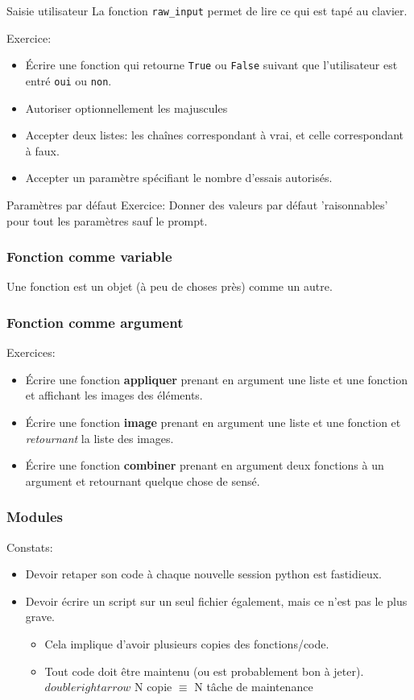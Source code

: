 \documentclass{beamer}
\begin{document}
\begin{frame}{Saisie utilisateur}
  La fonction {\tt raw\_input} permet de lire ce qui est tapé au clavier.

  Exercice:
  \begin{itemize}
  \item Écrire une fonction qui retourne {\tt True} ou {\tt False} suivant que l'utilisateur est entré {\tt oui} ou {\tt non}.
  \item Autoriser optionnellement les majuscules
  \item Accepter deux listes: les chaînes correspondant à vrai, et celle correspondant à faux.
  \item Accepter un paramètre spécifiant le nombre d'essais autorisés.
  \end{itemize}
\end{frame}

\begin{frame}{Paramètres par défaut}
  Exercice: Donner des valeurs par défaut 'raisonnables' pour tout les paramètres sauf le prompt.
\end{frame}

\begin{frame}[fragile]\frametitle{Fonction comme variable}
  Une fonction est un objet (à peu de choses près) comme un autre.
  \fbox{}
\end{frame}

\begin{frame}[fragile]\frametitle{Fonction comme argument}
  Exercices:
  \begin{itemize}
  \item Écrire une fonction {\bf appliquer} prenant en argument une liste et une fonction et affichant les images des éléments.
  \item Écrire une fonction {\bf image} prenant en argument une liste et une fonction et {\em retournant} la liste des images.
  \item Écrire une fonction {\bf combiner} prenant en argument deux fonctions à un argument et retournant quelque chose de sensé.
  \end{itemize}
\end{frame}

\begin{frame}[fragile]\frametitle{Modules}
  Constats:
  \begin{itemize}
  \item Devoir retaper son code à chaque nouvelle session python est fastidieux.
  \item Devoir écrire un script sur un seul fichier également, mais ce n'est pas le plus grave.
    \begin{itemize}
    \item Cela implique d'avoir plusieurs copies des fonctions/code.
    \item Tout code doit être maintenu (ou est probablement bon à jeter). \linebreak
      $doublerightarrow$ N copie $\equiv$ N tâche de maintenance
    \end{itemize}
  \end{itemize}
\end{frame}
\end{document}
